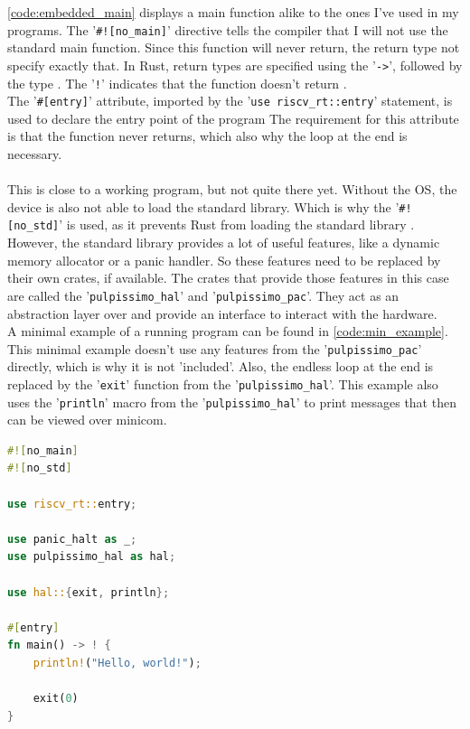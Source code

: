 \ref{code:embedded_main} displays a main function alike to the ones I've used in my programs.
The '\lstinline{#![no_main]}' directive tells the compiler that I will not use the standard main function.
Since this function will never return, the return type not specify exactly that.
In Rust, return types are specified using the '\lstinline{->}', followed by the type \cite{rust_return}.
The '\lstinline{!}' indicates that the function doesn't return \cite{rust_never_type}.
\\
The '\lstinline{#[entry]}' attribute, imported by the '\lstinline{use riscv_rt::entry}' statement, is used to declare the entry point of the program \cite{riscv_rt_entry}
The requirement for this attribute is that the function never returns, which also why the loop at the end is necessary.
\\\\
This is close to a working program, but not quite there yet.
Without the OS, the device is also not able to load the standard library.
Which is why the '\lstinline{#![no_std]}' is used, as it prevents Rust from loading the standard library \cite{rust_no_std}.
However, the standard library provides a lot of useful features, like a dynamic memory allocator or a panic handler.
So these features need to be replaced by their own crates, if available.
The crates that provide those features in this case are called the '\lstinline{pulpissimo_hal}' and '\lstinline{pulpissimo_pac}'.
They act as an abstraction layer over and provide an interface to interact with the hardware.
\\
A minimal example of a running program can be found in \ref{code:min_example}.
This minimal example doesn't use any features from the '\lstinline{pulpissimo_pac}' directly, which is why it is not 'included'.
Also, the endless loop at the end is replaced by the '\lstinline{exit}' function from the '\lstinline{pulpissimo_hal}'.
This example also uses the '\lstinline{println}' macro from the '\lstinline{pulpissimo_hal}' to print messages that then can be viewed over minicom.

\begin{lstlisting}[style=colorEX,language=Rust,caption={Minimal example of a program running on the pulpissimo hardware},label={code:min_example}]
#![no_main]
#![no_std]

use riscv_rt::entry;

use panic_halt as _;
use pulpissimo_hal as hal;

use hal::{exit, println};

#[entry]
fn main() -> ! {
    println!("Hello, world!");

    exit(0)
}
\end{lstlisting}


